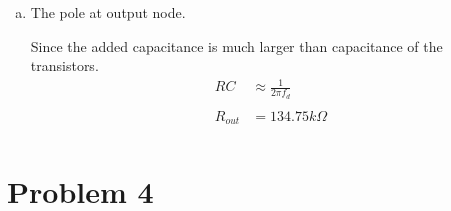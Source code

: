 \documentclass{article}
\begin{document}
\begin{enumerate}[(a)]
\item The pole at output node.

Since the added capacitance is much larger than capacitance of the transistors.
\begin{equation*}
\begin{aligned}
RC &\approx \frac{1}{2\pi{}f_{d}} \\
\\
R_{out} &= 134.75 k\Omega \\
\end{aligned}
\end{equation*}
\end{enumerate}

\section{Problem 4}
\label{sec:orgef146bd}
\end{document}
